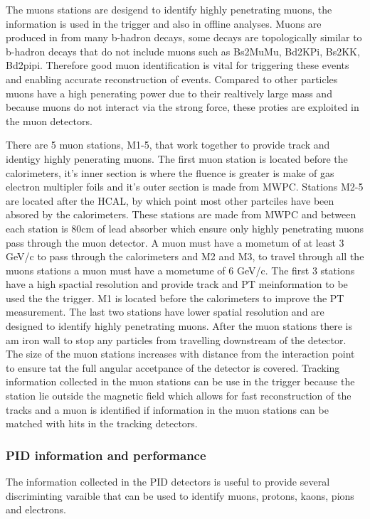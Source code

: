 The muons stations are desigend to identify highly penetrating muons, the information is used in the trigger and also in offline analyses. Muons are produced in from many b-hadron decays, some decays are topologically similar to b-hadron decays that do not include muons such as Bs2MuMu, Bd2KPi, Bs2KK, Bd2pipi. Therefore good muon identification is vital for triggering these events and enabling accurate reconstruction of events. 
Compared to other particles muons have a high penerating power due to their realtively large mass and because muons do not interact via the strong force, these proties are exploited in the muon detectors. 

There are 5 muon stations, M1-5, that work together to provide track and identigy highly penerating muons. The first muon station is located before the calorimeters, it's inner section is where the fluence is greater is make of gas electron multipler foils and it's outer section is made from MWPC. Stations M2-5 are located after the HCAL, by which point most other partciles have been absored by the calorimeters. These stations are made from MWPC and between each station is 80cm of lead absorber which ensure only highly penetrating muons pass through the muon detector. A muon must have a mometum of at least 3 GeV/c to pass through the calorimeters and M2 and M3, to travel through all the muons stations a muon must have a mometume of 6 GeV/c. 
The first 3 stations have a high spactial resolution and provide track and PT meinformation to be used the the trigger. M1 is located before the calorimeters to improve the PT measurement. The last two stations have lower spatial resolution and are designed to identify highly penetrating muons. After the muon stations there is am iron wall to stop any particles from travelling downstream of the detector. The size of the muon stations increases with distance from the interaction point to ensure tat the full angular accetpance of the detector is covered. Tracking information collected in the muon stations can be use in the trigger because the station lie outside the magnetic field which allows for fast reconstruction of the tracks and a muon is identified if information in the muon stations can be matched with hits in the tracking detectors. 

\subsubsection{PID information and performance}

The information collected in the PID detectors is useful to provide several discriminting varaible that can be used to identify muons, protons, kaons, pions and electrons.

